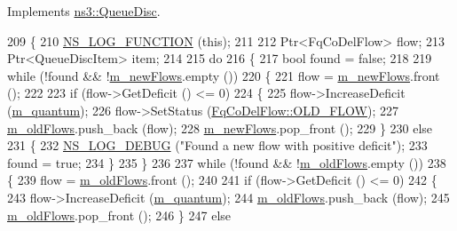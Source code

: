 Implements \hyperlink{classns3_1_1QueueDisc_afefae1a05f45db101c2c75d67a440c63}{ns3\+::\+Queue\+Disc}.


\begin{DoxyCode}
209 \{
210   \hyperlink{log-macros-disabled_8h_a90b90d5bad1f39cb1b64923ea94c0761}{NS\_LOG\_FUNCTION} (\textcolor{keyword}{this});
211 
212   Ptr<FqCoDelFlow> flow;
213   Ptr<QueueDiscItem> item;
214 
215   \textcolor{keywordflow}{do}
216     \{
217       \textcolor{keywordtype}{bool} found = \textcolor{keyword}{false};
218 
219       \textcolor{keywordflow}{while} (!found && !\hyperlink{classns3_1_1FqCoDelQueueDisc_ae0d12b788b8519457393fa0b37714947}{m\_newFlows}.empty ())
220         \{
221           flow = \hyperlink{classns3_1_1FqCoDelQueueDisc_ae0d12b788b8519457393fa0b37714947}{m\_newFlows}.front ();
222 
223           \textcolor{keywordflow}{if} (flow->GetDeficit () <= 0)
224             \{
225               flow->IncreaseDeficit (\hyperlink{classns3_1_1FqCoDelQueueDisc_ad4638258d780533e28cb83f27fb63a6c}{m\_quantum});
226               flow->SetStatus (\hyperlink{classns3_1_1FqCoDelFlow_afbdbeaa5fc8659ada26a5d7f0e277b39a16cf978971383163caae2cc85e8c7df6}{FqCoDelFlow::OLD\_FLOW});
227               \hyperlink{classns3_1_1FqCoDelQueueDisc_a025a35ed71b066c207dcc74afae8f215}{m\_oldFlows}.push\_back (flow);
228               \hyperlink{classns3_1_1FqCoDelQueueDisc_ae0d12b788b8519457393fa0b37714947}{m\_newFlows}.pop\_front ();
229             \}
230           \textcolor{keywordflow}{else}
231             \{
232               \hyperlink{group__logging_ga413f1886406d49f59a6a0a89b77b4d0a}{NS\_LOG\_DEBUG} (\textcolor{stringliteral}{"Found a new flow with positive deficit"});
233               found = \textcolor{keyword}{true};
234             \}
235         \}
236 
237       \textcolor{keywordflow}{while} (!found && !\hyperlink{classns3_1_1FqCoDelQueueDisc_a025a35ed71b066c207dcc74afae8f215}{m\_oldFlows}.empty ())
238         \{
239           flow = \hyperlink{classns3_1_1FqCoDelQueueDisc_a025a35ed71b066c207dcc74afae8f215}{m\_oldFlows}.front ();
240 
241           \textcolor{keywordflow}{if} (flow->GetDeficit () <= 0)
242             \{
243               flow->IncreaseDeficit (\hyperlink{classns3_1_1FqCoDelQueueDisc_ad4638258d780533e28cb83f27fb63a6c}{m\_quantum});
244               \hyperlink{classns3_1_1FqCoDelQueueDisc_a025a35ed71b066c207dcc74afae8f215}{m\_oldFlows}.push\_back (flow);
245               \hyperlink{classns3_1_1FqCoDelQueueDisc_a025a35ed71b066c207dcc74afae8f215}{m\_oldFlows}.pop\_front ();
246             \}
247           \textcolor{keywordflow}{else}

\end{DoxyCode}

